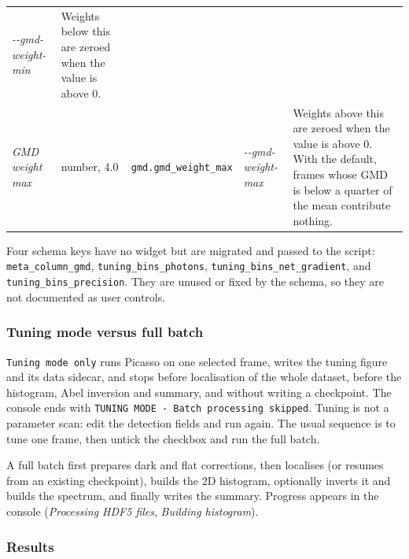 \documentclass[11pt,a4paper]{article}
\newcommand{\code}[1]{\texttt{#1}}
\begin{document}
\begin{center}
\begin{longtable}{@{}L{3.4cm}L{2.3cm}L{2.5cm}L{2.8cm}L{4.9cm}@{}}
\emph{-\allowbreak{}-\allowbreak{}gmd-\allowbreak{}weight-\allowbreak{}min} & Weights below this are zeroed when the value is
above 0. \\
\addlinespace
\emph{GMD weight max} & number, 4.0 & \code{gmd.\allowbreak{}gmd\_\allowbreak{}weight\_\allowbreak{}max} &
\emph{-\allowbreak{}-\allowbreak{}gmd-\allowbreak{}weight-\allowbreak{}max} & Weights above this are zeroed when the value is
above 0. With the default, frames whose GMD is below a quarter of the mean
contribute nothing. \\
\end{longtable}
\end{center}

Four schema keys have no widget but are migrated and passed to the script:
\code{meta\_\allowbreak{}column\_\allowbreak{}gmd}, \code{tuning\_\allowbreak{}bins\_\allowbreak{}photons},
\code{tuning\_\allowbreak{}bins\_\allowbreak{}net\_\allowbreak{}gradient}, and \code{tuning\_\allowbreak{}bins\_\allowbreak{}precision}. They are
unused or fixed by the schema, so they are not documented as user controls.

\subsubsection*{Tuning mode versus full batch}

\code{Tuning mode only} runs Picasso on one selected frame, writes the
tuning figure and its data sidecar, and stops before localisation of the
whole dataset, before the histogram, Abel inversion and summary, and without
writing a checkpoint. The console ends with
\code{TUNING MODE - Batch processing skipped}. Tuning is not a parameter
scan: edit the detection fields and run again. The usual sequence is to tune
one frame, then untick the checkbox and run the full batch.

A full batch first prepares dark and flat corrections, then localises (or
resumes from an existing checkpoint), builds the 2D histogram, optionally
inverts it and builds the spectrum, and finally writes the summary. Progress
appears in the console (\emph{Processing HDF5 files}, \emph{Building
histogram}).

\subsubsection*{Results}
\end{document}
